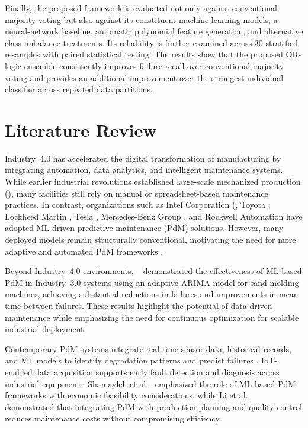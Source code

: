 \documentclass[final,5p, twocolumn]{elsarticle}
\begin{document}
Finally, the proposed framework is evaluated not only against conventional majority voting but also against its constituent machine-learning models, a neural-network baseline, automatic polynomial feature generation, and alternative class-imbalance treatments. Its reliability is further examined across 30 stratified resamples with paired statistical testing. The results show that the proposed OR-logic ensemble consistently improves failure recall over conventional majority voting and provides an additional improvement over the strongest individual classifier across repeated data partitions.

\color{black}

\section{Literature Review}

Industry~4.0 has accelerated the digital transformation of manufacturing by integrating automation, data analytics, and intelligent maintenance systems. While earlier industrial revolutions established large-scale mechanized production (\cite{choi2023modeling}), many facilities still rely on manual or spreadsheet-based maintenance practices. In contrast, organizations such as Intel Corporation (\cite{yee2024intel}, Toyota \cite{li2024equipment}, Lockheed Martin \cite{maybury2025lockheed,adhikari2018machine}, Tesla \cite{sun2024digital}, Mercedes-Benz Group \cite{solisenhancing,shinde2025gen}, and Rockwell Automation \cite{ye2018system,butler2024future} have adopted ML-driven predictive maintenance (PdM) solutions. However, many deployed models remain structurally conventional, motivating the need for more adaptive and automated PdM frameworks \cite{cheng2020data}.

Beyond Industry~4.0 environments, ~\cite{mohan2021intelligent} demonstrated the effectiveness of ML-based PdM in Industry~3.0 systems using an adaptive ARIMA model for sand molding machines, achieving substantial reductions in failures and improvements in mean time between failures. These results highlight the potential of data-driven maintenance while emphasizing the need for continuous optimization for scalable industrial deployment.

Contemporary PdM systems integrate real-time sensor data, historical records, and ML models to identify degradation patterns and predict failures \cite{zonta2020predictive}. IoT-enabled data acquisition supports early fault detection and diagnosis across industrial equipment \cite{ayvaz2021predictive}. Shamayleh et al.~\cite{shamayleh2020criticality,shamayleh2020iot} emphasized the role of ML-based PdM frameworks with economic feasibility considerations, while Li et al.~\cite{li2023data} demonstrated that integrating PdM with production planning and quality control reduces maintenance costs without compromising efficiency.
\end{document}
